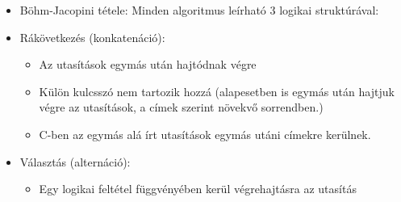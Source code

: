 \documentclass[12pt,a4paper]{article}
\begin{document}
            \begin{tcolorbox}[colback=blue!5!white,colframe=blue!50!black,title= 16. Ismertesse az alapvető algoritmus-elemeket a Böhm-Jacopini tétel alapján!]
                \begin{itemize}
                    \item Böhm-Jacopini tétele: Minden algoritmus leírható 3 logikai struktúrával:
                    \item Rákövetkezés (konkatenáció):
                    \begin{itemize}
                        \item Az utasítások egymás után hajtódnak végre
                        \item Külön kulcsszó nem tartozik hozzá (alapesetben is egymás után hajtjuk végre az utasítások, a címek szerint növekvő sorrendben.) 
                        \item C-ben az egymás alá írt utasítások egymás utáni címekre kerülnek.
                        \begin{center}
                        \end{center}
                    \end{itemize}
                    \item Választás (alternáció):
                    \begin{itemize}
                        \item Egy logikai feltétel függvényében kerül végrehajtásra az utasítás

\end{itemize}
\end{itemize}
\end{tcolorbox}
\end{document}
